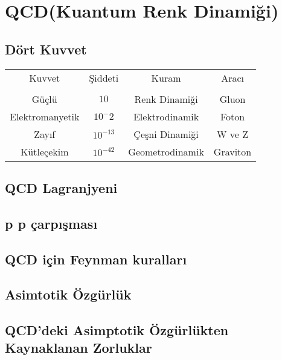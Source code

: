 \section{QCD(Kuantum Renk Dinamiği)}
\subsection{Dört Kuvvet}
\begin{center}
\begin{tabular}{|c|c|c|c|}
\hline
Kuvvet & Şiddeti & Kuram & Aracı \\
 & & &\\
\hline 
Güçlü & $10$ & Renk Dinamiği & Gluon \\ 
\hline 
Elektromanyetik & $10^-2$ & Elektrodinamik & Foton \\ 
\hline 
Zayıf & $10^{-13}$ & Çeşni Dinamiği & W ve Z \\ 
\hline 
Kütleçekim & $10^{-42}$ & Geometrodinamik & Graviton \\ 
\hline 
\end{tabular} 
\end{center}
\newpage
\subsection{QCD Lagranjyeni}
\newpage
\subsection{p p çarpışması}
\newpage
\subsection{QCD için Feynman kuralları}
\newpage
\subsection{Asimtotik Özgürlük}
\newpage
\subsection{QCD'deki Asimptotik Özgürlükten Kaynaklanan Zorluklar}
\newpage
